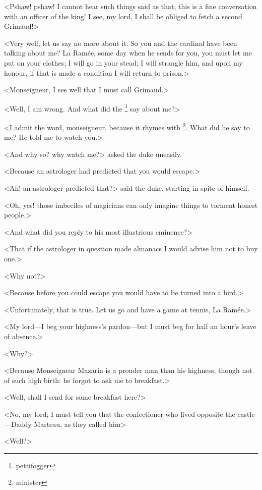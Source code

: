 <Pshaw! pshaw! I cannot hear such things said as that; this is a fine conversation with an officer of the king! I see, my lord, I shall be obliged to fetch a second Grimaud!>

<Very well, let us say no more about it. So you and the cardinal have been talking about me? La Ramée, some day when he sends for you, you must let me put on your clothes; I will go in your stead; I will strangle him, and upon my honour, if that is made a condition I will return to prison.>

<Monseigneur, I see well that I must call Grimaud.>

<Well, I am wrong. And what did the \footnote{pettifogger} say about me?>

<I admit the word, monseigneur, because it rhymes with \footnote{minister}. What did he say to me? He told me to watch you.>

<And why so? why watch me?> asked the duke uneasily.

<Because an astrologer had predicted that you would escape.>

<Ah! an astrologer predicted that?> said the duke, starting in spite of himself.

<Oh,  yes! those imbeciles of magicians can only imagine things to torment honest people.>

<And what did you reply to his most illustrious eminence?>

<That if the astrologer in question made almanacs I would advise him not to buy one.>

<Why not?>

<Because before you could escape you would have to be turned into a bird.>

<Unfortunately, that is true. Let us go and have a game at tennis, La Ramée.>

<My lord—I beg your highness's pardon—but I must beg for half an hour's leave of absence.>

<Why?>

<Because Monseigneur Mazarin is a prouder man than his highness, though not of such high birth: he forgot to ask me to breakfast.>

<Well, shall I send for some breakfast here?>

<No, my lord; I must tell you that the confectioner who lived opposite the castle—Daddy Marteau, as they called him\longdash>

<Well?>


